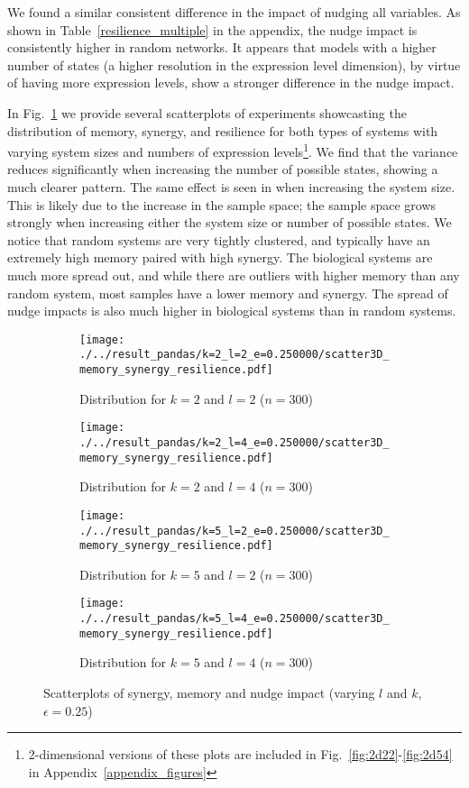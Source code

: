 \documentclass[../main.tex]{subfiles}
\begin{document}
We found a similar consistent difference in the impact of nudging all variables.
As shown in Table~\ref{resilience_multiple} in the appendix, the nudge impact is consistently higher in random networks.
It appears that models with a higher number of states (a higher resolution in the expression level dimension), by virtue of having more expression levels, show a stronger difference in the nudge impact.

In Fig.~\ref{fig:3dscatter} we provide several scatterplots of experiments showcasting the distribution of memory, synergy, and resilience for both types of systems with varying system sizes and numbers of expression levels\footnote{2-dimensional versions of these plots are included in Fig.~\ref{fig:2d22}-\ref{fig:2d54} in Appendix~\ref{appendix_figures}}.
We find that the variance reduces significantly when increasing the number of possible states, showing a much clearer pattern.
The same effect is seen in when increasing the system size.
This is likely due to the increase in the sample space; the sample space grows strongly when increasing either the system size or number of possible states.
We notice that random systems are very tightly clustered, and typically have an extremely high memory paired with high synergy.
The biological systems are much more spread out, and while there are outliers with higher memory than any random system, most samples have a lower memory and synergy.
The spread of nudge impacts is also much higher in biological systems than in random systems.

\begin{figure}[ht]
    \centering
    \begin{subfigure}[b]{0.45\textwidth}
        \texttt{[image: ./../result\_pandas/k=2\_l=2\_e=0.250000/scatter3D\_memory\_synergy\_resilience.pdf]}
        \caption{Distribution for $k=2$ and $l=2$ ($n=300$)}
    \end{subfigure}
    \begin{subfigure}[b]{0.45\textwidth}
        \texttt{[image: ./../result\_pandas/k=2\_l=4\_e=0.250000/scatter3D\_memory\_synergy\_resilience.pdf]}
        \caption{Distribution for $k=2$ and $l=4$ ($n=300$)}
    \end{subfigure}
\bigskip
    \begin{subfigure}[b]{0.45\textwidth}
        \texttt{[image: ./../result\_pandas/k=5\_l=2\_e=0.250000/scatter3D\_memory\_synergy\_resilience.pdf]}
        \caption{Distribution for $k=5$ and $l=2$ ($n=300$)}
    \end{subfigure}
    \begin{subfigure}[b]{0.45\textwidth}
        \texttt{[image: ./../result\_pandas/k=5\_l=4\_e=0.250000/scatter3D\_memory\_synergy\_resilience.pdf]}
        \caption{Distribution for $k=5$ and $l=4$ ($n=300$)}
    \end{subfigure}
    \caption{Scatterplots of synergy, memory and nudge impact (varying $l$ and $k$, $\epsilon = 0.25$)}
    \label{fig:3dscatter}
\end{figure}
\end{document}
